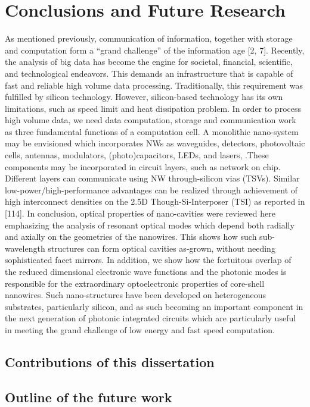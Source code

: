 \chapter{Conclusions and Future Research} \label{conclusions}

As mentioned previously, communication of information, together with storage and computation form a “grand challenge” of the information age [2, 7]. Recently, the analysis of big data has become the engine for societal, financial, scientific, and technological endeavors. This demands an infrastructure that is capable of fast and reliable high volume data processing. Traditionally, this requirement was fulfilled by silicon technology. However, silicon-based technology has its own limitations, such as speed limit and heat dissipation problem. In order to process high volume data, we need data computation, storage and communication work as three fundamental functions of a computation cell. A monolithic nano-system may be envisioned which incorporates NWs as waveguides, detectors, photovoltaic cells, antennas, modulators, (photo)capacitors, LEDs, and lasers, .These components may be incorporated in circuit layers, such as network on chip. Different layers can communicate using NW through-silicon vias (TSVs). Similar low-power/high-performance advantages can be realized through achievement of high interconnect densities on the 2.5D Though-Si-Interposer (TSI) as reported in [114]. 
In conclusion, optical properties of nano-cavities were reviewed here emphasizing the analysis of resonant optical modes which depend both radially and axially on the geometries of the nanowires. This shows how such sub-wavelength structures can form optical cavities as-grown, without needing sophisticated facet mirrors. In addition, we show how the fortuitous overlap of the reduced dimensional electronic wave functions and the photonic modes is responsible for the extraordinary optoelectronic properties of core-shell nanowires. Such nano-structures have been developed on heterogeneous substrates, particularly silicon, and as such becoming an important component in the next generation of photonic integrated circuits which are particularly useful in meeting the grand challenge of low energy and fast speed computation.
\section{Contributions of this dissertation}
\section{Outline of the future work}

